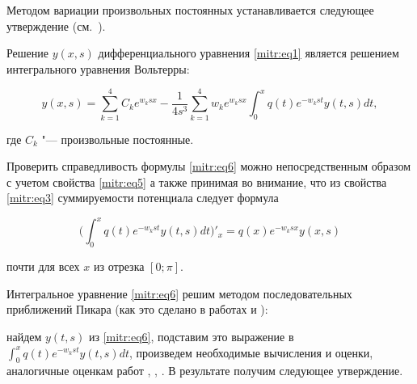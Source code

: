 Методом вариации произвольных постоянных устанавливается следующее утверждение (см.~\cite{mitr:bib4,mitr:bib5}).



\begin{lemma}[1]Решение $y(x,s)$ дифференциального уравнения \eqref{mitr:eq1} является решением интегрального уравнения Вольтерры{\rm :}

\begin{equation}

\label{mitr:eq6}

y(x,s)=\sum^4_{k=1}C_k e^{w_ksx}-\frac1{4s^3}

\sum^4_{k=1}w_k e^{w_ksx}\int^x_0 q(t) e^{-w_kst} y(t,s)dt,

\end{equation}

где $C_k$ "--- произвольные постоянные.

\end{lemma}





Проверить справедливость формулы \eqref{mitr:eq6} можно непосредственным образом с учетом свойства \eqref{mitr:eq5} а также принимая во внимание, что из свойства \eqref{mitr:eq3}  суммируемости потенциала следует формула

$$\biggl(\int^x_0q(t) e^{-w_kst}y(t,s) dt\biggr)'_x=q(x)e^{-w_ksx} y(x,s)$$

почти для всех $x$ из отрезка $[0;\pi]$.



Интегральное уравнение \eqref{mitr:eq6} решим методом последовательных приближений Пикара (как это сделано в работах   \cite{mitr:bib4} и  \cite{mitr:bib5}): 

найдем $y(t,s)$ из \eqref{mitr:eq6}, подставим это выражение в $\displaystyle \int^x_0 q(t) e^{-w_kst} y(t,s)dt$, произведем необходимые вычисления и оценки, аналогичные оценкам работ  \cite{mitr:bib4, mitr:bib5}, \cite[гл.~2]{mitr:bib16}, \cite[гл.~1]{mitr:bib17}. В результате получим следующее утверждение.



\smallskip



